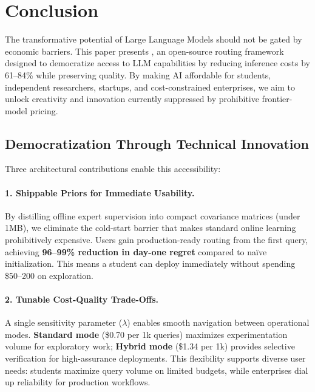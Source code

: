 
\section{Conclusion}
\label{sec:conclusion}

The transformative potential of Large Language Models should not be gated by economic barriers. This paper presents \ours{}, an open-source routing framework designed to democratize access to LLM capabilities by reducing inference costs by 61--84\% while preserving quality. By making AI affordable for students, independent researchers, startups, and cost-constrained enterprises, we aim to unlock creativity and innovation currently suppressed by prohibitive frontier-model pricing.

\subsection{Democratization Through Technical Innovation}

Three architectural contributions enable this accessibility:

\paragraph{1. Shippable Priors for Immediate Usability.}
By distilling offline expert supervision into compact covariance matrices (under 1MB), we eliminate the cold-start barrier that makes standard online learning prohibitively expensive. Users gain production-ready routing from the first query, achieving \textbf{96--99\% reduction in day-one regret} compared to na\"ive initialization. This means a student can deploy \ours{} immediately without spending \$50--200 on exploration.

\paragraph{2. Tunable Cost-Quality Trade-Offs.}
A single sensitivity parameter ($\lambda$) enables smooth navigation between operational modes. \textbf{Standard mode} (\$0.70 per 1k queries) maximizes experimentation volume for exploratory work; \textbf{Hybrid mode} (\$1.34 per 1k) provides selective verification for high-assurance deployments. This flexibility supports diverse user needs: students maximize query volume on limited budgets, while enterprises dial up reliability for production workflows.

